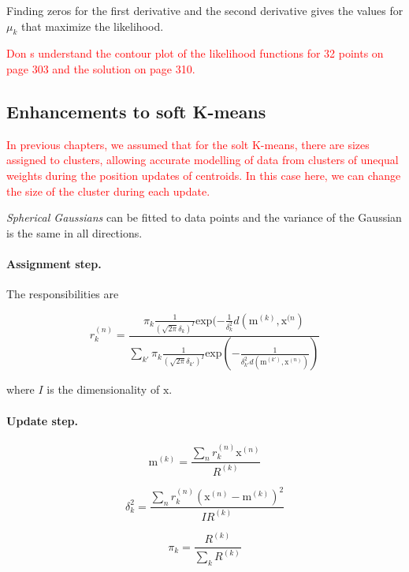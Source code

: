 \documentclass[11pt]{article}
\begin{document}
Finding zeros for the first derivative and the second derivative gives the values for ${\mu_k}$ that maximize the likelihood.

\textcolor{red}{Don \textquotesingle s understand the contour plot of the likelihood functions for 32 points on page 303 and the solution on page 310.}

\subsection{Enhancements to soft K-means}
\textcolor{red}{In previous chapters, we assumed that for the solt K-means, there are sizes assigned to clusters, allowing accurate modelling of data from clusters of unequal weights during the position updates of centroids. In this case here, we can change the size of the cluster during each update.} 

\textit{Spherical Gaussians} can be fitted to data points and the variance of the Gaussian is the same in all directions. 

\paragraph{Assignment step.}
The responsibilities are

\begin{equation}
  r_k^{(n)} = \frac{\pi_k \frac{1}{(\sqrt{2\pi}\delta_k)^I}\mathrm{exp}(-\frac{1}{\delta^2_k}d(\mathrm{m}^{(k)},\mathrm{x}^{(n})}{\sum_{k'}\pi_k \frac{1}{(\sqrt{2\pi}\delta_{k'})^I}\mathrm{exp}(-\frac{1}{\delta^2_{k'} d(\mathrm{m}^{(k')},\mathrm{x}^{(n)})})} 
\end{equation}

where $I$ is the dimensionality of $\mathrm{x}$.

\paragraph{Update step.}

\begin{equation}
  \mathrm{m}^{(k)} = \frac{\sum_n r^{(n)}_k \mathrm{x}^{(n)}}{R^{(k)}}
\end{equation}

\begin{equation}
  \delta^2_k = \frac{\sum_n r^{(n)}_k (\mathrm{x}^{(n)} - \mathrm{m}^{(k)})^2}{I R^{(k)}}
\end{equation}

\begin{equation}
  \pi_k = \frac{R^{(k)}}{\sum_k R^{(k)}}
\end{equation}
\end{document}
